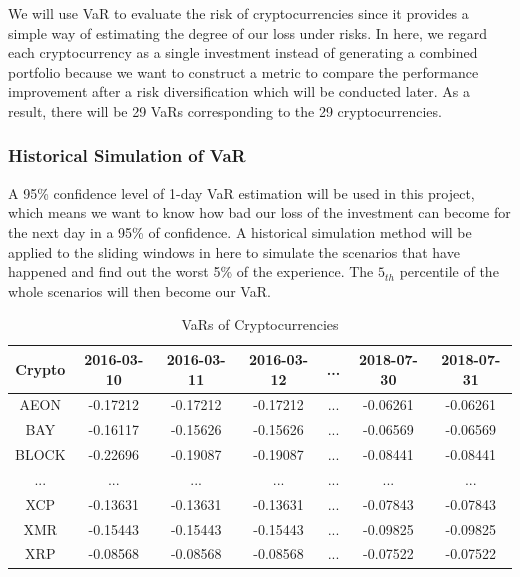 \documentclass[11pt]{article} %
\theoremstyle{plain}
\theoremstyle{definition}
\begin{document}
We will use VaR to evaluate the risk of cryptocurrencies since it provides a simple way of estimating the degree of our loss under risks. In here, we regard each cryptocurrency as a single investment instead of generating a combined portfolio because we want to construct a metric to compare the performance improvement after a risk diversification which will be conducted later. As a result, there will be 29 VaRs corresponding to the 29 cryptocurrencies.

\subsubsection{Historical Simulation of VaR}

A 95\% confidence level of 1-day VaR estimation will be used in this project, which means we want to know how bad our loss of the investment can become for the next day in a 95\% of confidence. A historical simulation method will be applied to the sliding windows in here to simulate the scenarios that have happened and find out the worst 5\% of the experience. The $5_{th}$ percentile of the whole scenarios will then become our VaR.

{
  \begin{table}[ht]
    \centering
    \small
    \begin{tabular}{|c|c c c c c c|}
        \hline
        Crypto & 2016-03-10 & 2016-03-11 & 2016-03-12 & ... & 2018-07-30 & 2018-07-31 \\ [0.5ex]
        \hline
        AEON & -0.17212 & -0.17212 & -0.17212 & ... & -0.06261 & -0.06261 \\
        \hline
        BAY & -0.16117 & -0.15626 & -0.15626 & ... & -0.06569 & -0.06569 \\
        \hline
        BLOCK & -0.22696 & -0.19087 & -0.19087 & ... & -0.08441 & -0.08441 \\
        \hline
        ... & ... & ... & ... & ... & ... & ... \\
        \hline
        XCP & -0.13631 & -0.13631 & -0.13631 & ... & -0.07843 & -0.07843 \\
        \hline
        XMR & -0.15443 & -0.15443 & -0.15443 & ... & -0.09825 & -0.09825 \\
        \hline
        XRP & -0.08568 & -0.08568 & -0.08568 & ... & -0.07522 & -0.07522 \\
        \hline
    \end{tabular}
    \caption{VaRs of Cryptocurrencies}
    \label{table:varcrypto}
  \end{table}
}
\end{document}
